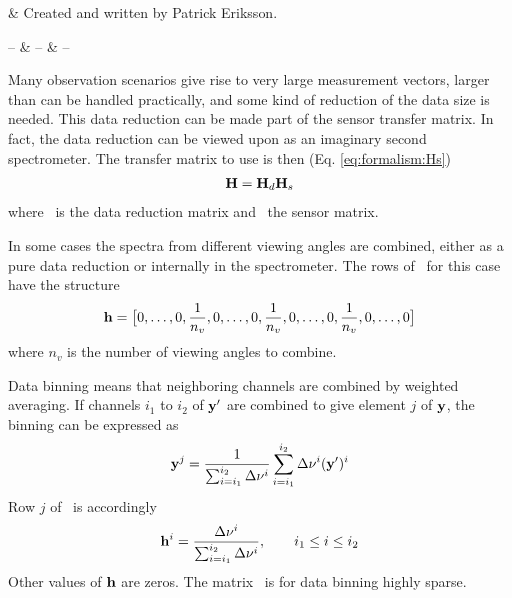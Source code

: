 %
%
 \label{sec:red}


%
%
 & Created and written by Patrick Eriksson.\\
\stophistory


%
%
%
\startsymbols
  -- & -- & -- \\
 \label{symtable:red}     
\stopsymbols



%
%
Many observation scenarios give rise to very large measurement
vectors, larger than can be handled practically, and some kind
of reduction of the data size is needed. This data reduction can be
made part of the sensor transfer matrix. In fact, the data reduction
can be viewed upon as an imaginary second spectrometer. The transfer
matrix to use is then (Eq. \ref{eq:formalism:Hs})
\begin{eqnarray}
  \mathbf{H} = \mathbf{H}_d \mathbf{H}_s  \nonumber
\end{eqnarray}
where \Hd\ is the data reduction matrix and \Hs\ the sensor matrix.



 \label{sec:red:view}
 
 In some cases the spectra from different viewing angles are combined,
 either as a pure data reduction or internally in the spectrometer.
 The rows of \Hd\ for this case have the structure
 \begin{equation}
   \mathbf{h} = \big[ 0,\dots,0,\frac{1}{n_v},0,\dots,0,\frac{1}{n_v},0,\dots,0,\frac{1}{n_v},0,\dots,0\big]
 \end{equation}
 where $n_v$ is the number of viewing angles to combine.


 \label{sec:red:binning}
 
 Data binning means that neighboring channels are combined by
 weighted averaging. If channels $i_1$ to $i_2$ of $\mathbf{y}'$ are combined to
 give element $j$ of $\mathbf{y}$, the binning can be expressed as
 \begin{equation}
   \mathbf{y}^j = \frac{1}{\sum_{i=i_1}^{i_2}{\Delta \nu^i}} \sum_{i=i_1}^{i_2}{\Delta \nu^i (\mathbf{y}')^i}
 \end{equation}
 Row $j$ of \Hd\ is accordingly
 \begin{equation}
   \mathbf{h}^i = \frac{\Delta \nu^i}{\sum_{i=i_1}^{i_2}{\Delta \nu^i}}, \qquad
    i_1\leq i \leq i_2
 \end{equation}
 Other values of $\mathbf{h}$ are zeros. The matrix \Hd\ is for data
 binning highly sparse.



